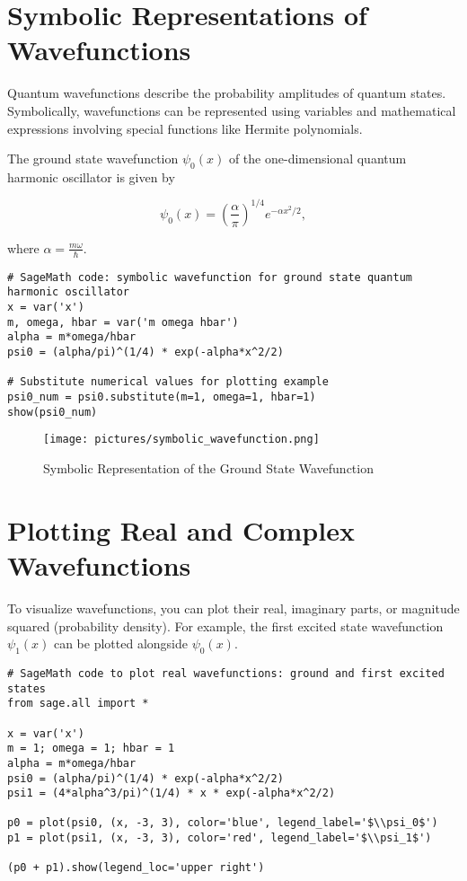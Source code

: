 \documentclass[12pt]{book}
\begin{document}
\section{Symbolic Representations of Wavefunctions}

Quantum wavefunctions describe the probability amplitudes of quantum states. Symbolically, wavefunctions can be represented using variables and mathematical expressions involving special functions like Hermite polynomials.

The ground state wavefunction \(\psi_0(x)\) of the one-dimensional quantum harmonic oscillator is given by

\[
\psi_0(x) = \left(\frac{\alpha}{\pi}\right)^{1/4} e^{-\alpha x^2/2},
\]

where \(\alpha = \frac{m \omega}{\hbar}\).

\begin{verbatim}
# SageMath code: symbolic wavefunction for ground state quantum harmonic oscillator
x = var('x')
m, omega, hbar = var('m omega hbar')
alpha = m*omega/hbar
psi0 = (alpha/pi)^(1/4) * exp(-alpha*x^2/2)

# Substitute numerical values for plotting example
psi0_num = psi0.substitute(m=1, omega=1, hbar=1)
show(psi0_num)
\end{verbatim}

\begin{figure}[H]
  \centering
  \texttt{[image: pictures/symbolic\_wavefunction.png]}
  \caption{Symbolic Representation of the Ground State Wavefunction}
  \label{fig:symbolic_wavefunction}
\end{figure}

\section{Plotting Real and Complex Wavefunctions}

To visualize wavefunctions, you can plot their real, imaginary parts, or magnitude squared (probability density). For example, the first excited state wavefunction \(\psi_1(x)\) can be plotted alongside \(\psi_0(x)\).

\begin{verbatim}
# SageMath code to plot real wavefunctions: ground and first excited states
from sage.all import *

x = var('x')
m = 1; omega = 1; hbar = 1
alpha = m*omega/hbar
psi0 = (alpha/pi)^(1/4) * exp(-alpha*x^2/2)
psi1 = (4*alpha^3/pi)^(1/4) * x * exp(-alpha*x^2/2)

p0 = plot(psi0, (x, -3, 3), color='blue', legend_label='$\\psi_0$')
p1 = plot(psi1, (x, -3, 3), color='red', legend_label='$\\psi_1$')

(p0 + p1).show(legend_loc='upper right')
\end{verbatim}
\end{document}
